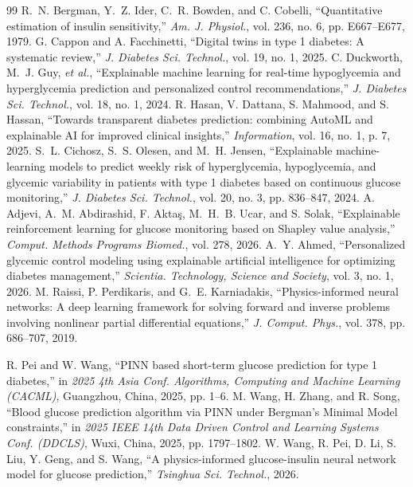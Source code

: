 \documentclass[journal]{IEEEtran}
\begin{document}
\begin{thebibliography}{99}
\enlargethispage{6in}
 R.~N. Bergman, Y.~Z. Ider, C.~R. Bowden, and C. Cobelli, ``Quantitative estimation of insulin sensitivity,'' \emph{Am. J. Physiol.}, vol. 236, no. 6, pp. E667--E677, 1979.
 G. Cappon and A. Facchinetti, ``Digital twins in type 1 diabetes: A systematic review,'' \emph{J. Diabetes Sci. Technol.}, vol. 19, no. 1, 2025.
 C. Duckworth, M.~J. Guy, \emph{et al.}, ``Explainable machine learning for real-time hypoglycemia and hyperglycemia prediction and personalized control recommendations,'' \emph{J. Diabetes Sci. Technol.}, vol. 18, no. 1, 2024.
 R. Hasan, V. Dattana, S. Mahmood, and S. Hassan, ``Towards transparent diabetes prediction: combining AutoML and explainable AI for improved clinical insights,'' \emph{Information}, vol. 16, no. 1, p. 7, 2025.
 S.~L. Cichosz, S.~S. Olesen, and M.~H. Jensen, ``Explainable machine-learning models to predict weekly risk of hyperglycemia, hypoglycemia, and glycemic variability in patients with type 1 diabetes based on continuous glucose monitoring,'' \emph{J. Diabetes Sci. Technol.}, vol. 20, no. 3, pp. 836--847, 2024.
 A. Adjevi, A.~M. Abdirashid, F. Akta\c{s}, M.~H.~B. Ucar, and S. Solak, ``Explainable reinforcement learning for glucose monitoring based on Shapley value analysis,'' \emph{Comput. Methods Programs Biomed.}, vol. 278, 2026.
 A.~Y. Ahmed, ``Personalized glycemic control modeling using explainable artificial intelligence for optimizing diabetes management,'' \emph{Scientia. Technology, Science and Society}, vol. 3, no. 1, 2026.
 M. Raissi, P. Perdikaris, and G.~E. Karniadakis, ``Physics-informed neural networks: A deep learning framework for solving forward and inverse problems involving nonlinear partial differential equations,'' \emph{J. Comput. Phys.}, vol. 378, pp. 686--707, 2019.

 R. Pei and W. Wang, ``PINN based short-term glucose prediction for type 1 diabetes,'' in \emph{2025 4th Asia Conf. Algorithms, Computing and Machine Learning (CACML)}, Guangzhou, China, 2025, pp. 1--6.
 M. Wang, H. Zhang, and R. Song, ``Blood glucose prediction algorithm via PINN under Bergman's Minimal Model constraints,'' in \emph{2025 IEEE 14th Data Driven Control and Learning Systems Conf. (DDCLS)}, Wuxi, China, 2025, pp. 1797--1802.
 W. Wang, R. Pei, D. Li, S. Liu, Y. Geng, and S. Wang, ``A physics-informed glucose-insulin neural network model for glucose prediction,'' \emph{Tsinghua Sci. Technol.}, 2026.


\end{thebibliography}
\end{document}
